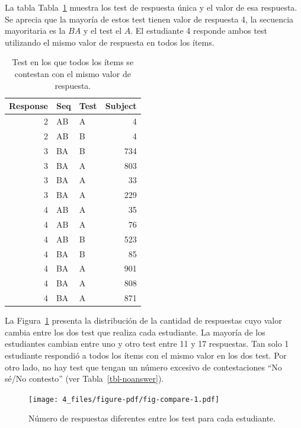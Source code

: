 \documentclass[
  12pt,
  a4paper,
  extrafontsizes,
  onecolumn,
  openright,
  table]{memoir}
\begin{document}
La tabla Tabla~\ref{tbl-distinct2} muestra los test de respuesta única y
el valor de esa respuesta. Se aprecia que la mayoría de estos test
tienen valor de respuesta 4, la secuencia mayoritaria es la \(BA\) y el
test el \(A\). El estudiante 4 responde ambos test utilizando el mismo
valor de respuesta en todos los ítems.

\clearpage

\hypertarget{tbl-distinct2}{}
\begin{longtable}{rllr}
\caption{\label{tbl-distinct2}Test en los que todos los ítems se contestan con el mismo valor de
respuesta. }\tabularnewline

\toprule
Response & Seq & Test & Subject \\ 
\midrule
2 & AB & A & 4 \\ 
2 & AB & B & 4 \\ 
3 & BA & B & 734 \\ 
3 & BA & A & 803 \\ 
3 & BA & A & 33 \\ 
3 & BA & A & 229 \\ 
4 & AB & A & 35 \\ 
4 & AB & A & 76 \\ 
4 & AB & B & 523 \\ 
4 & BA & B & 85 \\ 
4 & BA & A & 901 \\ 
4 & BA & A & 808 \\ 
4 & BA & A & 871 \\ 
\bottomrule
\end{longtable}

La Figura~\ref{fig-compare} presenta la distribución de la cantidad de
respuestas cuyo valor cambia entre los dos test que realiza cada
estudiante. La mayoría de los estudiantes cambian entre uno y otro test
entre 11 y 17 respuestas. Tan solo 1 estudiante respondió a todos los
ítems con el mismo valor en los dos test. Por otro lado, no hay test que
tengan un número excesivo de contestaciones \enquote{No sé/No contesto}
(ver Tabla~\ref{tbl-noanswer}).

\begin{figure}[h]

{\centering \texttt{[image: 4\_files/figure-pdf/fig-compare-1.pdf]}

}

\caption{\label{fig-compare}Número de respuestas diferentes entre los
test para cada estudiante.}

\end{figure}
\end{document}
